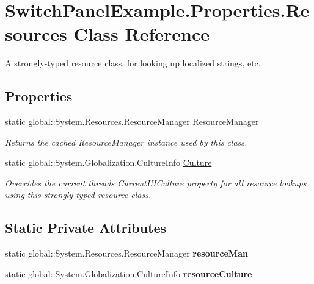 \hypertarget{class_switch_panel_example_1_1_properties_1_1_resources}{}\section{Switch\+Panel\+Example.\+Properties.\+Resources Class Reference}
\label{class_switch_panel_example_1_1_properties_1_1_resources}


A strongly-\/typed resource class, for looking up localized strings, etc.  


\subsection*{Properties}
\begin{DoxyCompactItemize}
\item 
static global\+::\+System.\+Resources.\+Resource\+Manager \mbox{\hyperlink{class_switch_panel_example_1_1_properties_1_1_resources_a956f4bc67df44cb911483575c8cd9d66}{Resource\+Manager}}
\begin{DoxyCompactList}\small\item\em Returns the cached Resource\+Manager instance used by this class. \end{DoxyCompactList}\item 
static global\+::\+System.\+Globalization.\+Culture\+Info \mbox{\hyperlink{class_switch_panel_example_1_1_properties_1_1_resources_a1dfff582a9857cbbe958e3257e6c01e7}{Culture}}
\begin{DoxyCompactList}\small\item\em Overrides the current thread\textquotesingle{}s Current\+U\+I\+Culture property for all resource lookups using this strongly typed resource class. \end{DoxyCompactList}\end{DoxyCompactItemize}
\subsection*{Static Private Attributes}
\begin{DoxyCompactItemize}
\item 
\mbox{\label{class_switch_panel_example_1_1_properties_1_1_resources_ac03de79d30de797b54ceb4f6f057d0f8}} 
static global\+::\+System.\+Resources.\+Resource\+Manager {\bfseries resource\+Man}
\item 
\mbox{\label{class_switch_panel_example_1_1_properties_1_1_resources_a4917ec7fd731f50e74c2feaa67901fef}} 
static global\+::\+System.\+Globalization.\+Culture\+Info {\bfseries resource\+Culture}
\end{DoxyCompactItemize}


